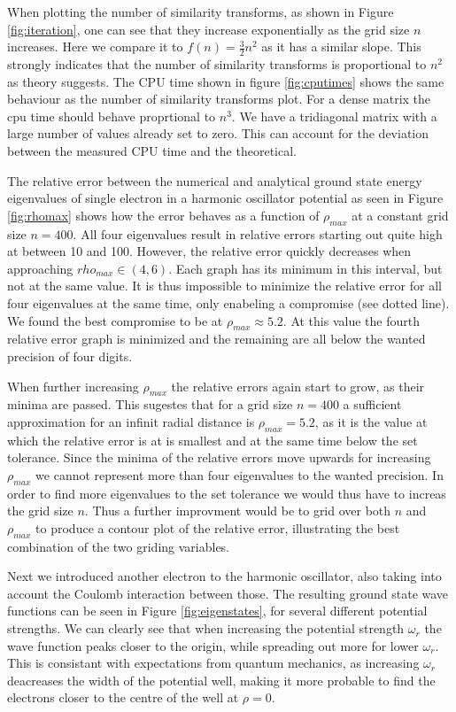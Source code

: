 \documentclass[twocolumn]{aastex62}
\begin{document}
When plotting the number of similarity transforms, as shown in Figure \ref{fig:iteration}, one can see that they increase exponentially as the grid size $n$ increases. Here we compare it to $f(n) =\frac{3}{2}n^2$ as it has a similar slope. This strongly indicates that the number of similarity transforms is proportional to $n^2$ as theory suggests. The CPU time shown in figure \ref{fig:cputimes} shows the same behaviour as the number of similarity transforms plot. For a dense matrix the cpu time should behave proprtional to $n^3$. We have a tridiagonal matrix with a large number of values already set to zero. This can account for the deviation between the measured CPU time and the theoretical.  

The relative error between the numerical and analytical ground state energy eigenvalues of single electron in a harmonic oscillator potential as seen in Figure \ref{fig:rhomax} shows how the error behaves as a function of $\rho_{max}$ at a constant grid size $n = 400$. All four eigenvalues result in relative errors starting out quite high at between 10 and 100. However, the relative error quickly decreases when approaching $rho_{max}\in(4,6)$. Each graph has its minimum in this interval, but not at the same value. It is thus impossible to minimize the relative error for all four eigenvalues at the same time, only enabeling a compromise (see dotted line). We found the best compromise to be at $\rho_{max}\approx 5.2$. At this value the fourth relative error graph is minimized and the remaining are all below the wanted precision of four digits. 

When further increasing $\rho_{max}$ the relative errors again start to grow, as their minima are passed. This sugestes that for a grid size $n = 400$ a sufficient approximation for an infinit radial distance is $\rho_{max} = 5.2$, as it is the value at which the relative error is at is smallest and at the same time below the set tolerance. Since the minima of the relative errors move upwards for increasing $\rho_{max}$ we cannot represent more than four eigenvalues to the wanted precision. In order to find more eigenvalues to the set tolerance we would thus have to increas the grid size $n$. Thus a further improvment would be to grid over both $n$ and $\rho_{max}$ to produce a contour plot of the relative error, illustrating the best combination of the two griding variables.

Next we introduced another electron to the harmonic oscillator, also taking into account the Coulomb interaction between those. The resulting ground state wave functions can be seen in Figure \ref{fig:eigenstates}, for several different potential strengths. We can clearly see that when increasing the potential strength $\omega_r$ the wave function peaks closer to the origin, while spreading out more for lower $\omega_r$. This is consistant with expectations from quantum mechanics, as increasing $\omega_r$ deacreases the width of the potential well, making it more probable to find the electrons closer to the centre of the well at $\rho = 0$.
\end{document}
